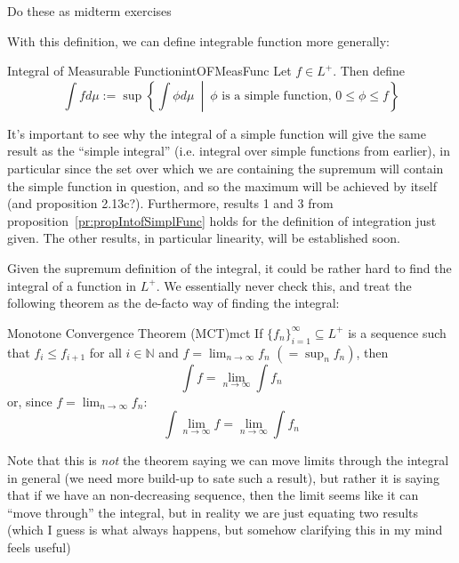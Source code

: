 \documentclass[oneside]{book}
\newcommand{\N}{\mathbb{N}}
\newcommand{\sse}{\subseteq}
\newcommand{\set}[2]{\left\{#1 \ \middle|\ #2\right\}}
\newcommand{\rw}{\rightarrow}
\begin{document}
\begin{Proof}
	Do these as midterm exercises
\end{Proof}


With this definition, we can define integrable function more generally:

\begin{defn}{Integral of Measurable Function}{intOFMeasFunc}
	Let $f \in L^+$. Then define
	\[
		\int f d\mu := \sup\set{\int \phi d\mu}{\text{$\phi$ is a simple function, }0 \le \phi \le f}
	\]
\end{defn}

It's important to see why the integral of a simple function will give the same result as the ``simple integral'' (i.e.
integral over simple functions from earlier), in particular since the set over which we are containing the supremum will
contain the simple function in question, and so the maximum will be achieved by itself (and proposition 2.13c?).
Furthermore, results 1 and 3 from proposition~\ref{pr:propIntofSimplFunc} holds for the definition of integration just
given. The other results, in particular linearity, will be established soon.

Given the supremum definition of the integral, it could be rather hard to find the integral of a function in $L^+$. We
essentially never check this, and treat the following theorem as the de-facto way of finding the integral:

\begin{thm}{Monotone Convergence Theorem (MCT)}{mct}
	If $\{f_n\}_{i=1}^\infty \sse L^+$ is a sequence such that $f_i \le f_{i+1}$ for all $i \in \N$ and $f = \lim_{n \rw
	\infty} f_n$ $(=\sup_n f_n)$, then
	\[
		\int f = \lim_{n \rw \infty}\int f_n
	\]
	or, since $f = \lim_{n \rw \infty} f_n$:
	\[
		\int \lim_{n \rw \infty} f = \lim_{n \rw \infty}\int f_n
	\]
\end{thm}

Note that this is \emph{not} the theorem saying we can move limits through the integral in general (we need more
build-up to sate such a result), but rather it is saying that if we have an non-decreasing sequence, then the limit
seems like it can ``move through'' the integral, but in reality we are just equating two results (which I guess is
what always happens, but somehow clarifying this in my mind feels useful)
\end{document}
